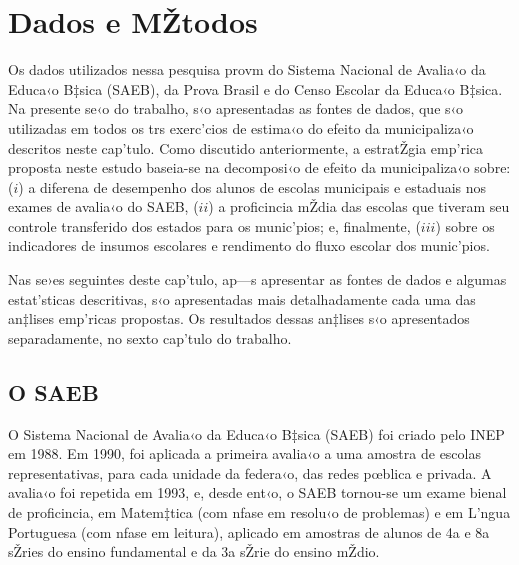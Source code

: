 \documentclass[a4paper, 12pt]{article}
\begin{document}


\pagebreak

\section{Dados e MŽtodos}

Os dados utilizados nessa pesquisa provm do Sistema Nacional de Avalia‹o da Educa‹o B‡sica (SAEB), da Prova Brasil e do Censo Escolar da Educa‹o B‡sica. Na presente se‹o do trabalho, s‹o apresentadas as fontes de dados, que s‹o utilizadas em todos os trs exerc’cios de estima‹o do efeito da municipaliza‹o descritos neste cap’tulo. Como discutido anteriormente, a estratŽgia emp’rica proposta neste estudo baseia-se na decomposi‹o de efeito da municipaliza‹o sobre: ($i$) a diferena de desempenho dos alunos de escolas municipais e estaduais nos exames de avalia‹o do SAEB, ($ii$) a proficincia mŽdia das escolas que tiveram seu controle transferido dos estados para os munic’pios; e, finalmente, ($iii$) sobre os indicadores de insumos escolares e rendimento do fluxo escolar dos munic’pios. 

Nas se›es seguintes deste cap’tulo, ap—s apresentar as fontes de dados e algumas estat’sticas descritivas, s‹o apresentadas mais detalhadamente cada uma das an‡lises emp’ricas propostas. Os resultados dessas an‡lises s‹o apresentados separadamente, no sexto cap’tulo do trabalho.

\subsection{O SAEB}

O Sistema Nacional de Avalia‹o da Educa‹o B‡sica (SAEB) foi criado pelo INEP em 1988. Em 1990, foi aplicada a primeira avalia‹o a uma amostra de escolas representativas, para cada unidade da federa‹o, das redes pœblica e privada. A avalia‹o foi repetida em 1993, e, desde ent‹o, o SAEB tornou-se um exame bienal de proficincia, em Matem‡tica (com nfase em resolu‹o de problemas) e em L’ngua Portuguesa (com nfase em leitura), aplicado em amostras de alunos de 4a e 8a sŽries do ensino fundamental e da 3a sŽrie do ensino mŽdio.	
\end{document}
